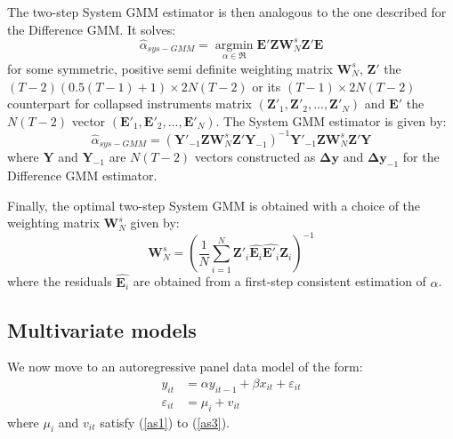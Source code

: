 The two-step System GMM estimator is then analogous to the one described for the Difference GMM. It solves:
\[
{{\hat \alpha }_{sys - GMM}} = \mathop {\arg \min }\limits_{\alpha  \in \Re } \mathbf{E}' \mathbf{Z}{\mathbf{W}_{N}^s}\mathbf{Z}'\mathbf{E} 
\]
for some symmetric, positive semi definite weighting matrix $\mathbf{W}_{N}^s$, $\mathbf{Z}'$ the $(T-2)(0.5(T-1)+1)\times 2N(T-2)$ or its $(T-1)\times 2N(T-2)$ counterpart for collapsed instruments matrix $(\mathbf{Z}'_{1},\mathbf{Z}'_{2},...,\mathbf{Z}'_{N})$ and $\mathbf{E}'$ the $N(T-2)$ vector $(\mathbf{E}'_1,\mathbf{E}'_2,...,\mathbf{E}'_N)$. The System GMM estimator is given by:
\[
{{\hat \alpha }_{sys - GMM}} = {\left( \mathbf{Y}'_{-1}\mathbf{Z} \mathbf{W}_{N}^s \mathbf{Z}' \mathbf{Y}_{-1} \right)^{ - 1}} \mathbf{Y}'_{-1}\mathbf{Z} \mathbf{W}_{N}^s \mathbf{Z}' \mathbf{Y} 
\]
where $\mathbf{Y}$ and $\mathbf{Y}_{-1}$ are $N(T-2)$ vectors constructed as $\mathbf{\Delta y}$ and $\mathbf{\Delta y}_{-1}$ for the Difference GMM estimator.

Finally, the optimal two-step System GMM is obtained with a choice of the weighting matrix $\mathbf{W}_{N}^s$ given by:
\[
\mathbf{W}_{N}^s=\left( \frac{1}{N} \sum\limits_{i=1}^{N} \mathbf{Z}'_{i} \hat{ \mathbf{E}_i} \hat{ \mathbf{E}'_i} \mathbf{Z}_{i} \right)^{-1}
\]
where the residuals $\hat{ \mathbf{E}_i}$ are obtained from a first-step consistent estimation of $\alpha$.


\subsection*{Multivariate models}

We now move to an autoregressive panel data model of the form:
\begin{equation}
\label{modelarmul}
\tag{8'}
\begin{aligned}
y_{it}&=\alpha y_{it-1} + \beta x_{it} + \varepsilon_{it}\\
\varepsilon_{it}&=\mu _{i}+v_{it}
\end{aligned}
\end{equation}
where $\mu _{i}$ and $v_{it}$ satisfy (\ref{as1}) to (\ref{as3}).

